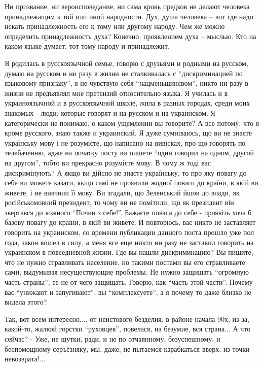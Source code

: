 \begin{itemize}
{

Ни призвание, ни вероисповедание, ни сама кровь предков не делают человека
принадлежащим к той или иной народности. Дух, душа человека – вот где надо
искать принадлежность его к тому или другому народу. Чем же можно определить
принадлежность духа? Конечно, проявлением духа – мыслью. Кто на каком языке
думает, тот тому народу и принадлежит.


Я родилась в русскоязычной семье, говорю с друзьями и родными на русском, думаю
на русском и ни разу в жизни не сталкивалась с \enquote{дискриминацией по языковому
признаку}, я не чувствую себя \enquote{нацменьшинсвом}, никто ни разу в жизни не
предъявлял мне претензий относительно языка. Я училась и в украиноязычной и в
русскоязычной школе, жила в разных городах, среди моих знакомых - люди, которые
говорят и на русском и на украинском. Я категорически не понимаю, о каком
ущемлении вы говорите? А все потому, что я кроме русского, знаю также и
украинский. Я дуже сумніваюсь, що ви не знаєте українську мову і не розумієте,
що написано на вивісках, про що говорять по телебаченню, адже на початку посту
ви пишете \enquote{один говорил на одном, другой на другом}, тобто ви прекрасно
розумієте мову. В чому ж тоді вас дискримінують? А якщо ви дійсно не знаєте
українську, то про яку повагу до себе ви можете казати, якщо самі не проявили
жодної поваги до країни, в якій ви живете, і не вивчили її мову. Ви згадали, що
Зеленський йшов до влади, як російськомовний президент, то чому ви не помітили,
що як президент він звертався до кожного \enquote{Почни з себе!}. Бажаєте поваги до
себе - проявіть хоча б базову повагу до країни, в якій ви живете. И повторюсь,
вас никто не заставляет говорить на украинском, со времени публикации данного
поста прошло уже пол года, закон вошел в силу, а меня все еще никто ни разу не
заставил говорить на украинском в повседневной жизни. Где вы нашли
дискриминацию? Вы пишите, что не нужно стравливать население, но такими постами
вы его стравливаете сами, выдумывая несуществующие проблемы. Не нужно защищать
\enquote{огромную часть страны}, ее не от чего защищать. Говорю, как \enquote{часть этой
части}. Почему вас \enquote{унижают и запугивают}, вы \enquote{комплексуете}, а я почему то
даже близко не видела этого?


Так, вот всем интересно..., от неистового безделия, в районе начала 90х, из-за,
какой-то, жалкой горстки \enquote{руховцев}, повелася, на безумие, вся страна...
А что сейчас?
- Уже, не шутки, ради, и не по отчаянному, безуспешному, и беспомощному серъёзняку, мы, даже, не пытаемся карабкаться вверх, из точки невозврата!...

}
\end{itemize}
